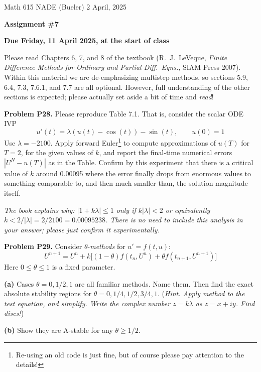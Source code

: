 \documentclass[12pt]{amsart}
\newcommand{\prob}[1]{\bigskip\noindent\textbf{#1}\quad }
\newcommand{\epart}[1]{\medskip\noindent\textbf{(#1)}\quad }
\begin{document}
\scriptsize \noindent Math 615 NADE (Bueler) \hfill 2 April, 2025
\normalsize

\medskip\bigskip

\Large\centerline{\textbf{Assignment \#7}}
\large
\bigskip

\centerline{\textbf{Due Friday, 11 April 2025, at the start of class}}
\bigskip
\normalsize

\thispagestyle{empty}

\bigskip
Please read Chapters 6, 7, and 8 of the textbook (R.~J.~LeVeque, \emph{Finite Difference Methods for Ordinary and Partial Diff.~Eqns.}, SIAM Press 2007).  Within this material we are de-emphasizing multistep methods, so sections 5.9, 6.4, 7.3, 7.6.1, and 7.7 are all optional.  However, full understanding of the other sections is expected; please actually set aside a bit of time and \emph{read}!

\medskip


\prob{Problem P28.}  Please reproduce Table 7.1.  That is, consider the scalar ODE IVP
	$$u'(t) = \lambda \left( u(t) - \cos(t) \right) - \sin(t), \qquad u(0)=1$$
Use $\lambda=-2100$.  Apply forward Euler\footnote{Re-using an old code is just fine, but of course please pay attention to the details!} to compute approximations of $u(T)$ for $T=2$, for the given values of $k$, and report the final-time numerical errors $|U^N - u(T)|$ as in the Table.  Confirm by this experiment that there is a critical value of $k$ around 0.00095 where the error finally drops from enormous values to something comparable to, and then much smaller than, the solution magnitude itself.

\medskip
\noindent \emph{The book explains why: $|1+k\lambda| \le 1$ only if $k|\lambda|<2$ or equivalently $k < 2/|\lambda| = 2/2100 = 0.00095238$.  There is no need to include this analysis in your answer; please just confirm it experimentally.}


\prob{Problem P29.}  Consider $\theta$-\emph{methods} for $u' = f(t,u)$:
   $$U^{n+1} = U^n + k\Big[(1-\theta)f(t_n,U^n) + \theta f(t_{n+1},U^{n+1})\Big]$$
Here $0\le \theta \le 1$ is a fixed parameter.

\epart{a} Cases $\theta = 0,1/2,1$ are all familiar methods.  Name them.  Then find the exact absolute stability regions for $\theta = 0,1/4,1/2,3/4,1$.  (\emph{Hint. Apply method to the test equation, and simplify.  Write the complex number $z=k\lambda$ as $z=x+iy$.  Find discs!})

\epart{b} Show they are A-stable for any $\theta \geq 1/2$.
\end{document}
